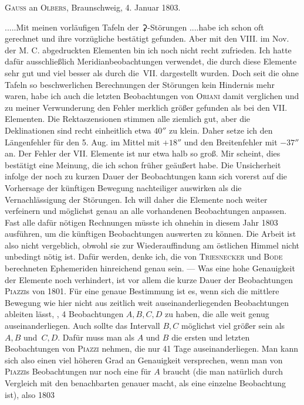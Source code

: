 \begin{center}
\textsc{Gauss} an \textsc{Olbers}, Braunschweig, 4. Januar 1803.
\end{center}
\noindent\hspace*{\parindent}.\quad.\quad.\quad.\quad.\quad Mit meinen vorläufigen Tafeln der {\AstroSymbols ⚳}-Störungen .\quad.\quad.\quad.\quad habe ich schon oft gerechnet und ihre vorzügliche  bestätigt gefunden. Aber mit den VIII. im Nov. der M. C. abgedruckten Elementen bin ich noch nicht recht zufrieden. Ich hatte dafür ausschließlich Meridianbeobachtungen verwendet, die durch diese Elemente sehr gut und viel besser als durch die\, VII. dargestellt wurden. Doch seit die ohne Tafeln so beschwerlichen Berechnungen der Störungen kein Hindernis mehr waren, habe ich auch die letzten Beobachtungen von \textsc{Oriani} damit verglichen und zu meiner Verwunderung den Fehler merklich größer gefunden als bei den VII. Elementen. Die Rektaszensionen stimmen alle ziemlich gut, aber die Deklinationen sind recht einheitlich etwa \(40''\) zu klein. Daher setze ich den Längenfehler für den 5. Aug. im Mittel mit \(+18''\) und den Breitenfehler mit \(-37''\) an. Der Fehler der VII. Elemente ist nur etwa halb so groß. Mir scheint, dies bestätigt eine Meinung, die ich schon früher geäußert habe. Die Unsicherheit infolge der noch zu kurzen Dauer der Beobachtungen kann sich vorerst auf die Vorhersage der künftigen Bewegung nachteiliger auswirken als die Vernachlässigung der Störungen. Ich will daher die Elemente noch weiter verfeinern und möglichst genau an alle vorhandenen Beobachtungen anpassen. Fast alle dafür nötigen Rechnungen müsste ich ohnehin in diesem Jahr 1803 ausführen, um die künftigen Beobachtungen auswerten zu können. Die Arbeit ist also nicht vergeblich, obwohl sie zur Wiederauffindung am östlichen Himmel nicht unbedingt nötig ist. Dafür werden, denke ich, die von \textsc{Triesnecker} und \textsc{Bode} berechneten Ephemeriden hinreichend genau sein. — Was eine hohe Genauigkeit der Elemente noch verhindert, ist vor allem die kurze Dauer der Beobachtungen \textsc{Piazzi}s von 1801. Für eine genaue Bestimmung ist es, wenn sich die mittlere Bewegung wie hier nicht aus zeitlich weit auseinanderliegenden Beobachtungen ableiten lässt, , 4 Beobachtungen \(A,B,C,D\) zu haben, die alle weit genug auseinanderliegen. Auch sollte das Intervall \(B,C\) möglichst viel größer sein als \(A,B\) und\, \(C,D\). Dafür muss man als \(A\) und \(B\) die ersten und letzten Beobachtungen von \textsc{Piazzi} nehmen, die nur 41 Tage auseinanderliegen. Man kann sich also einen viel höheren Grad an Genauigkeit versprechen, wenn man von \textsc{Piazzi}s Beobachtungen nur noch eine für \(A\) braucht (die man natürlich durch Vergleich mit den benachbarten genauer macht, als eine einzelne Beobachtung ist), also 1803
